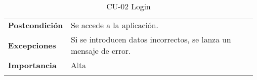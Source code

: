 \begin{longtable}[H]{@{}ll@{}}
\begin{minipage}[t]{0.23\columnwidth}
\textbf{Postcondición}\strut
\end{minipage} & \begin{minipage}[t]{0.71\columnwidth}\raggedright\strut
Se accede a la aplicación.\strut
\end{minipage}\tabularnewline
\begin{minipage}[t]{0.23\columnwidth}\raggedright\strut
\textbf{Excepciones}\strut
\end{minipage} & \begin{minipage}[t]{0.71\columnwidth}\raggedright\strut
Si se introducen datos incorrectos, se lanza un mensaje de error.
 \strut
\end{minipage}\tabularnewline
\begin{minipage}[t]{0.23\columnwidth}\raggedright\strut
\textbf{Importancia}\strut
\end{minipage} & \begin{minipage}[t]{0.71\columnwidth}\raggedright\strut
Alta\strut
\end{minipage}\tabularnewline
\bottomrule
\caption{CU-02 Login}
\end{longtable}



